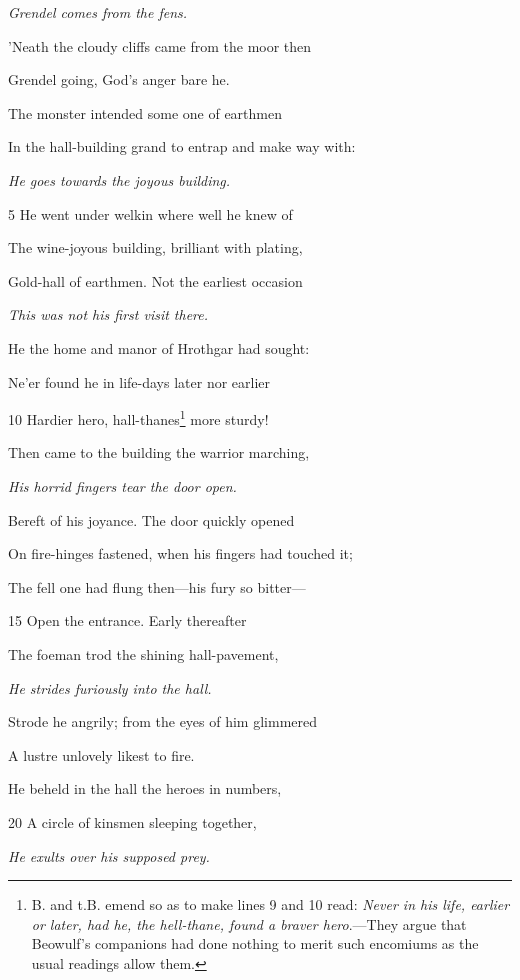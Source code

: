 

\emph{Grendel comes
from the fens.}

’Neath the cloudy cliffs came from the moor then

Grendel going, God’s anger bare he.

The monster intended some one of earthmen

In the hall-building grand to entrap and make way with:

\emph{He goes towards
the joyous building.}

5
He went under welkin where well he knew of

The wine-joyous building, brilliant with plating,

Gold-hall of earthmen. Not the earliest occasion

\emph{This was not his
first visit there.}

He the home and manor of Hrothgar had sought:

Ne’er found he in life-days later nor earlier

10
Hardier hero, hall-thanes\footnote{B. and t.B. emend so as to make lines 9 and 10 read: \emph{Never in his life,
earlier or later, had he, the hell-thane, found a braver hero}.—They argue
that Beowulf’s companions had done nothing to merit such encomiums as the
usual readings allow them.} more sturdy!

Then came to the building the warrior marching,

\emph{His horrid fingers
tear the door open.}

Bereft of his joyance. The door quickly opened

On fire-hinges fastened, when his fingers had touched it;

The fell one had flung then—his fury so bitter—

15
Open the entrance. Early thereafter

The foeman trod the shining hall-pavement,

\emph{He strides furiously
into the hall.}

Strode he angrily; from the eyes of him glimmered

A lustre unlovely likest to fire.

He beheld in the hall the heroes in numbers,

20
A circle of kinsmen sleeping together,

\emph{He exults over his
supposed prey.}

